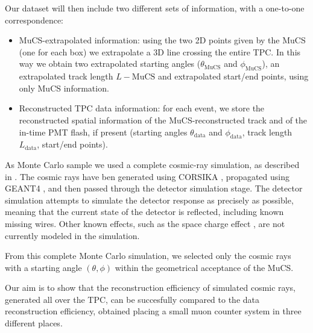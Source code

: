 \documentclass[a4paper]{scrartcl}
\begin{document}
Our dataset will then include two different sets of information, with a one-to-one correspondence:
\begin{itemize}
\item MuCS-extrapolated information: using the two 2D points given by the MuCS (one for each box) we extrapolate a 3D line crossing the entire TPC. In this way we obtain two extrapolated starting angles ($\theta_{\textrm{MuCS}}$ and $\phi_{\textrm{MuCS}}$), an extrapolated track length $L-{\textrm{MuCS}}$ and extrapolated start/end points, using only MuCS information.
\item Reconstructed TPC data information: for each event, we store the reconstructed spatial information of the MuCS-reconstructed track and of the in-time PMT flash, if present (starting angles $\theta_{\textrm{data}}$ and $\phi_{\textrm{data}}$, track length $L_{\textrm{data}}$, start/end points).
\end{itemize}


As Monte Carlo sample we used a complete cosmic-ray simulation, as described in \cite{mcdata}. The cosmic rays have ben generated using CORSIKA \cite{corsika},  propagated using GEANT4 \cite{geant}, and then passed through the detector simulation stage. The detector simulation attempts to simulate the detector response as precisely as possible, meaning that the current state of the detector is reflected, including known missing wires. Other known effects, such as the space charge effect \cite{spacecharge}, are not currently modeled in the simulation.

From this complete Monte Carlo simulation, we selected only the cosmic rays with a starting angle $(\theta,\phi)$ within the geometrical acceptance of the MuCS.

Our aim is to show that the reconstruction efficiency of simulated cosmic rays, generated all over the TPC, can be succesfully compared to the data reconstruction efficiency, obtained placing a small muon counter system in three different places.
\end{document}

